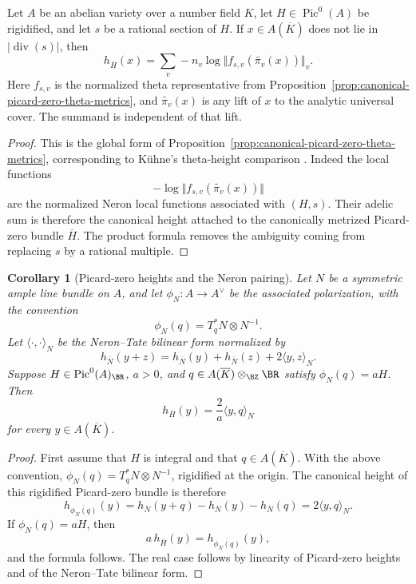 \documentclass[10pt,a4paper]{amsart}
\theoremstyle{plain}
\newtheorem{corollary}[theorem]{Corollary}
\theoremstyle{plain}
\numberwithin{equation}{section}
\begin{document}
\begin{prop}\label{prop:theta-neron-height}
	Let \(A\) be an abelian variety over a number field \(K\), let
	\(H\in\operatorname{Pic}^0(A)\) be rigidified, and let \(s\) be a rational
	section of \(H\).  If \(x\in A(\overline K)\) does not lie in
	\(\lvert\operatorname{div}(s)\rvert\), then
	\[
	h_{\overline H}(x)
	=
	\sum_v -n_v\log
	\bigl\Vert f_{s,v}(\widetilde{\pi_v}(x))\bigr\Vert_v .
	\]
	Here \(f_{s,v}\) is the normalized theta representative from
	Proposition~\ref{prop:canonical-picard-zero-theta-metrics}, and
	\(\widetilde{\pi_v}(x)\) is any lift of \(x\) to the analytic universal
	cover.  The summand is independent of that lift.
\end{prop}
\begin{proof}
	This is the global form of
	Proposition~\ref{prop:canonical-picard-zero-theta-metrics}, corresponding to
	K\"uhne's theta-height comparison \cite[Theorem~4.7]{Ku1}.  Indeed the local functions
	\[
	-\log\Vert f_{s,v}(\widetilde{\pi_v}(x))\Vert
	\]
	are the normalized Neron local functions associated with \((H,s)\).  Their
	adelic sum is therefore the canonical height attached to the canonically
	metrized Picard-zero bundle \(\overline H\).  The product formula removes
	the ambiguity coming from replacing \(s\) by a rational multiple.
\end{proof}
\begin{corollary}[Picard-zero heights and the Neron pairing]
	\label{cor:picard-zero-height-pairing}
	Let \(N\) be a symmetric ample line bundle on \(A\), and let
	\(\phi_N:A\to A^\vee\) be the associated polarization, with the convention
	\[
	\phi_N(q)=T_q^*N\otimes N^{-1}.
	\]
	Let \(\langle\cdot,\cdot\rangle_N\) be the Neron--Tate bilinear form normalized
	by
	\[
	h_{\overline N}(y+z)
	=h_{\overline N}(y)+h_{\overline N}(z)+2\langle y,z\rangle_N.
	\]
	Suppose
	\(H\in\operatorname{Pic}^0(A)_\BR\), \(a>0\), and
	\(q\in A(\overline K)\otimes_\BZ\BR\) satisfy \(\phi_N(q)=aH\).  Then
	\[
	h_{\overline H}(y)=\frac2a\langle y,q\rangle_N
	\]
	for every \(y\in A(\overline K)\).
\end{corollary}
\begin{proof}
	First assume that \(H\) is integral and that \(q\in A(\overline K)\).  With the
	above convention,
	\(\phi_N(q)=T_q^*N\otimes N^{-1}\), rigidified at the origin.  The canonical
	height of this rigidified Picard-zero bundle is therefore
	\[
	h_{\overline{\phi_N(q)}}(y)
	=h_{\overline N}(y+q)-h_{\overline N}(y)-h_{\overline N}(q)
	=2\langle y,q\rangle_N.
	\]
	If \(\phi_N(q)=aH\), then
	\[
	a\,h_{\overline H}(y)=h_{\overline{\phi_N(q)}}(y),
	\]
	and the formula follows.  The real case follows by linearity of Picard-zero
	heights and of the Neron--Tate bilinear form.
\end{proof}
\end{document}
